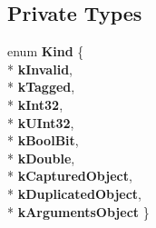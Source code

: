 \subsection*{Private Types}
\begin{DoxyCompactItemize}
\item 
enum {\bfseries Kind} \{ \\*
{\bfseries k\+Invalid}, 
\\*
{\bfseries k\+Tagged}, 
\\*
{\bfseries k\+Int32}, 
\\*
{\bfseries k\+U\+Int32}, 
\\*
{\bfseries k\+Bool\+Bit}, 
\\*
{\bfseries k\+Double}, 
\\*
{\bfseries k\+Captured\+Object}, 
\\*
{\bfseries k\+Duplicated\+Object}, 
\\*
{\bfseries k\+Arguments\+Object}
 \}\hypertarget{classv8_1_1internal_1_1_translated_value_ad94f4a869f67870fc11dbcd86f01fefb}{}\label{classv8_1_1internal_1_1_translated_value_ad94f4a869f67870fc11dbcd86f01fefb}

\end{DoxyCompactItemize}
